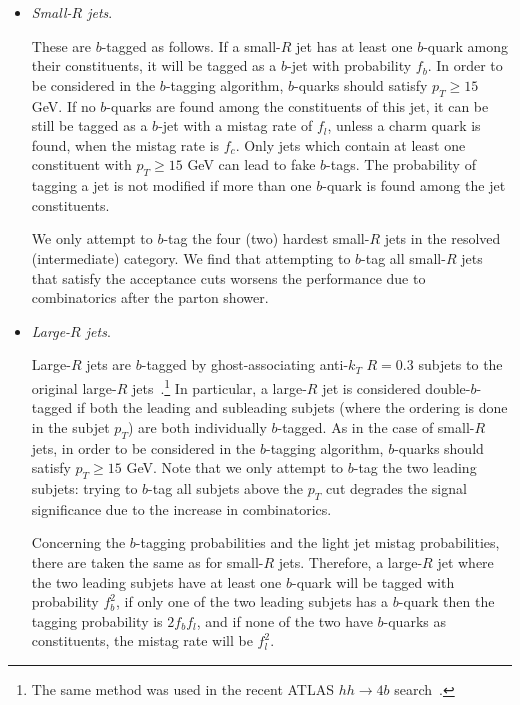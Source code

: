 \begin{itemize}

\item {\it Small-$R$ jets}.

  These are $b$-tagged as follows.
  If a small-$R$ jet has at least one $b$-quark among their constituents,
  it will be tagged as a $b$-jet with probability $f_b$.
  In order to be considered in the $b$-tagging algorithm,
   $b$-quarks should satisfy $p_T \ge 15$ GeV.
  If no $b$-quarks are found among the constituents
  of this jet, it can be still be tagged as a $b$-jet with
  a mistag rate of $f_l$, unless a charm quark is found,
  when the mistag rate is $f_c$.
  Only jets which contain at least one constituent
  with $p_T \ge 15$ GeV can lead to fake $b$-tags.
  The probability of tagging a jet is not modified
  if more than one $b$-quark is found among the jet constituents.

  We only attempt to $b$-tag the four (two) hardest small-$R$ jets
  in the resolved (intermediate) category.
  We find that
  attempting to $b$-tag all
  small-$R$ jets that satisfy the acceptance cuts worsens the performance
  due to combinatorics after the parton shower.

  \item {\it Large-$R$ jets}.

    Large-$R$ jets are $b$-tagged by
    ghost-associating anti-$k_T$ $R=0.3$
    subjets to the original large-$R$
    jets~\cite{Cacciari:2007fd,Aad:2013gja,
      ATLAS-CONF-2014-004}.\footnote{The same
    method was used in the recent ATLAS $hh\to 4b$ search~\cite{Aad:2015uka}.}
    In particular,
    a large-$R$ jet is considered  double-$b$-tagged if both
    the leading and subleading subjets (where the ordering
    is done in the subjet $p_T$) are both individually $b$-tagged.
    As in the case
    of small-$R$ jets, in
    order to be considered in the $b$-tagging algorithm,
   $b$-quarks should satisfy $p_T \ge 15$ GeV.
    Note that we only attempt to $b$-tag the two leading subjets:
    trying to $b$-tag all subjets above the $p_T$ cut degrades
    the signal significance due to the increase in combinatorics.

    Concerning the $b$-tagging probabilities and the
    light jet mistag probabilities, there are taken
    the same as for small-$R$ jets.
    Therefore, a large-$R$ jet where the two leading
    subjets have at least one $b$-quark will be tagged
    with probability $f_b^2$, if only one of the two leading
    subjets has a $b$-quark then the tagging probability is
    $2f_bf_l$, and if none of the two have $b$-quarks
    as constituents, the mistag rate will be
    $f_l^2$.


\end{itemize}

